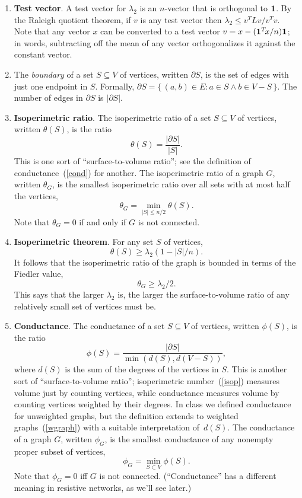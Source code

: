 \documentclass[11pt]{article}
\newcommand{\m}[1]{{\bf{#1}}}       %
\newcommand{\ones}{\m1}             %
\begin{document}
\begin{enumerate}
\item{\bf Test vector}.
A test vector for $\lambda_2$ is an $n$-vector that is
orthogonal to $\ones$.  By the Raleigh quotient theorem,
if $v$ is any test vector then $\lambda_2 \leq v^TLv/v^Tv$.
Note that any vector $x$ can be converted to a test vector 
$v = x - (\ones^T\!x/n) \ones$; in words, subtracting off
the mean of any vector orthogonalizes it against the constant
vector.

\item
The {\em boundary} of a set $S\subseteq V$ of vertices, written $\partial S$,
is the set of edges with just one endpoint in $S$. Formally,
$\partial S = \{\,(a,b)\in E : a \in S \wedge b \in V-S\,\}$.
The number of edges in $\partial S$ is $|\partial S|$.

\item\label{isop}{\bf Isoperimetric ratio}.
The isoperimetric ratio of a set $S\subseteq V$ of vertices,
written $\theta(S)$, is the ratio
$$\theta(S) = \frac{|\partial S|}{|S|}.$$
This is one sort of ``surface-to-volume ratio''; 
see the definition of conductance~(\ref{cond}) 
for another.
The isoperimetric ratio of a graph $G$,
written $\theta_G$, is the smallest isoperimetric ratio over all 
sets with at most half the vertices,
$$\theta_G = \min_{|S|\leq n/2}\theta(S).$$
Note that $\theta_G=0$ if and only if $G$ is not connected.

\item\label{isopthm} {\bf Isoperimetric theorem}.
For any set $S$ of vertices, 
$$\theta(S) \geq \lambda_2(1-|S|/n).$$
It follows that the isoperimetric ratio of the graph is bounded 
in terms of the Fiedler value,
$$\theta_G \geq \lambda_2/2.$$
This says that the larger $\lambda_2$ is, the larger the surface-to-volume
ratio of any relatively small set of vertices must be.

\item\label{cond}{\bf Conductance}.
The conductance of a set $S\subseteq V$ of vertices,
written $\phi(S)$, is the ratio 
$$\phi(S) = \frac{|\partial S|}{\min(d(S),d(V-S))},$$
where $d(S)$ is the sum of the degrees of the vertices in $S$.
This is another sort of ``surface-to-volume ratio'';
isoperimetric number~(\ref{isop}) measures volume just by counting vertices, 
while conductance measures volume by counting vertices weighted by their degrees.
In class we defined conductance for unweighted graphs,
but the definition extends to weighted graphs~(\ref{wgraph}) with
a suitable interpretation of~$d(S)$.
The conductance of a graph $G$,
written $\phi_G$, is the smallest conductance of any nonempty 
proper subset of vertices,
$$\phi_G = \min_{S\subset V}\phi(S).$$
Note that $\phi_G=0$ iff $G$ is not connected.
(``Conductance'' has a different meaning in resistive networks, as we'll see later.)


\end{enumerate}
\end{document}
